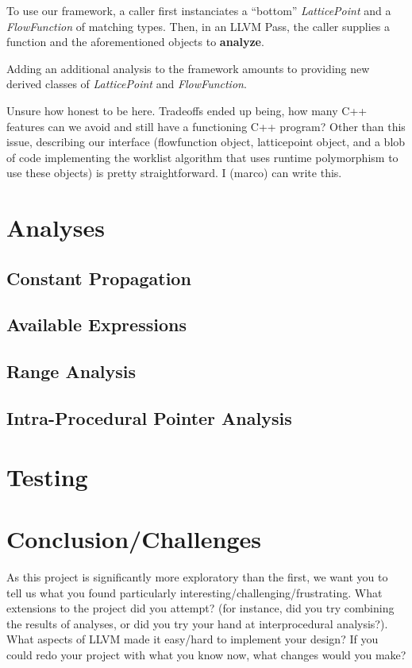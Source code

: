 \documentclass{article}
\theoremstyle{definition}
\begin{document}
To use our framework, a caller  first instanciates a ``bottom''
\emph{LatticePoint} and a \emph{FlowFunction} of matching types. Then,
in an LLVM Pass, the caller supplies a function and the aforementioned
objects to \textbf{analyze}. 

Adding an additional analysis to the framework amounts to providing
new derived classes of \emph{LatticePoint} and \emph{FlowFunction}.


Unsure how honest to be here. Tradeoffs ended up being, how many C++
features can we avoid and still have a functioning C++ program? Other
than this issue, describing our interface (flowfunction object,
latticepoint object, and a blob of code implementing the worklist
algorithm that uses runtime polymorphism to use these objects) is
pretty straightforward. I (marco) can write this.

\section{Analyses}

\subsection{Constant Propagation}


\subsection{Available Expressions}


\subsection{Range Analysis}



\subsection{Intra-Procedural Pointer Analysis}



\section{Testing}



\section{Conclusion/Challenges}
\begin{framed}
  As this project is significantly more exploratory than the first, we
  want you to tell us what you found particularly
  interesting/challenging/frustrating. What extensions to the project
  did you attempt? (for instance, did you try combining the results of
  analyses, or did you try your hand at interprocedural
  analysis?). What aspects of LLVM made it easy/hard to implement your
  design? If you could redo your project with what you know now, what
  changes would you make?
\end{framed}
\end{document}
